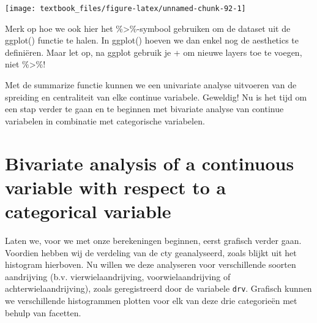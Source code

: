 \documentclass[]{tufte-book}
\newenvironment{Shaded}{}{}
\newcommand{\DataTypeTok}[1]{\textcolor[rgb]{0.56,0.13,0.00}{#1}}
\newcommand{\DecValTok}[1]{\textcolor[rgb]{0.25,0.63,0.44}{#1}}
\newcommand{\FloatTok}[1]{\textcolor[rgb]{0.25,0.63,0.44}{#1}}
\newcommand{\KeywordTok}[1]{\textcolor[rgb]{0.00,0.44,0.13}{\textbf{#1}}}
\newcommand{\NormalTok}[1]{#1}
\newcommand{\OperatorTok}[1]{\textcolor[rgb]{0.40,0.40,0.40}{#1}}
\newcommand{\StringTok}[1]{\textcolor[rgb]{0.25,0.44,0.63}{#1}}
\begin{document}
\begin{Shaded}
\end{Shaded}

\texttt{[image: textbook\_files/figure-latex/unnamed-chunk-92-1]}

Merk op hoe we ook hier het \%\textgreater\%-symbool gebruiken om de dataset uit de ggplot() functie te halen. In ggplot() hoeven we dan enkel nog de aesthetics te definiëren. Maar let op, na ggplot gebruik je + om nieuwe layers toe te voegen, niet \%\textgreater\%!

Met de summarize functie kunnen we een univariate analyse uitvoeren van de spreiding en centraliteit van elke continue variabele. Geweldig! Nu is het tijd om een stap verder te gaan en te beginnen met bivariate analyse van continue variabelen in combinatie met categorische variabelen.

\hypertarget{bivariate-analysis-of-a-continuous-variable-with-respect-to-a-categorical-variable}{%
\section{Bivariate analysis of a continuous variable with respect to a categorical variable}\label{bivariate-analysis-of-a-continuous-variable-with-respect-to-a-categorical-variable}}

Laten we, voor we met onze berekeningen beginnen, eerst grafisch verder gaan. Voordien hebben wij de verdeling van de cty geanalyseerd, zoals blijkt uit het histogram hierboven. Nu willen we deze analyseren voor verschillende soorten aandrijving (b.v. vierwielaandrijving, voorwielaandrijving of achterwielaandrijving), zoals geregistreerd door de variabele \texttt{drv}. Grafisch kunnen we verschillende histogrammen plotten voor elk van deze drie categorieën met behulp van facetten.
\end{document}
